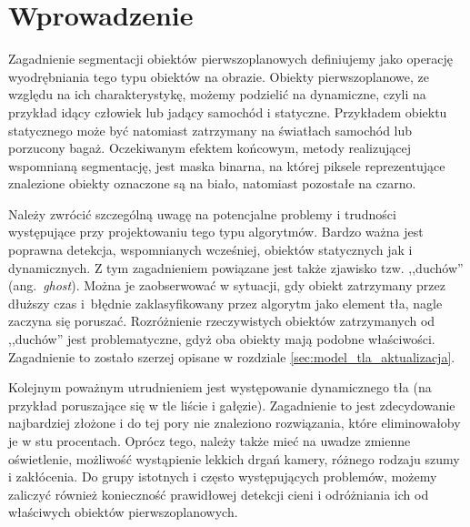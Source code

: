 \chapter{Wprowadzenie}
\label{cha:wprowadzenie}

Zagadnienie segmentacji obiektów pierwszoplanowych definiujemy jako operację wyodrębniania tego typu obiektów na obrazie. Obiekty pierwszoplanowe, ze względu na ich charakterystykę, możemy podzielić na dynamiczne, czyli na przykład idący człowiek lub jadący samochód i statyczne. 
Przykładem obiektu statycznego może być natomiast zatrzymany na światłach samochód lub porzucony bagaż.
Oczekiwanym efektem końcowym, metody realizującej wspomnianą segmentację, jest maska binarna, na której piksele reprezentujące znalezione obiekty oznaczone są na biało, natomiast pozostałe na czarno. 
 

Należy zwrócić szczególną uwagę na potencjalne problemy i trudności występujące przy projektowaniu tego typu algorytmów. 
Bardzo ważna jest poprawna detekcja, wspomnianych wcześniej, obiektów statycznych jak i dynamicznych. 
Z tym zagadnieniem powiązane jest także zjawisko tzw. ,,duchów'' (ang.~\textit{ghost}). 
Można je zaobserwować w sytuacji, gdy obiekt zatrzymany przez dłuższy czas i~błędnie zaklasyfikowany przez algorytm jako element tła, nagle zaczyna się poruszać. 
Rozróżnienie rzeczywistych obiektów zatrzymanych od ,,duchów'' jest problematyczne, gdyż oba obiekty mają podobne właściwości. 
Zagadnienie to zostało szerzej opisane w rozdziale \ref{sec:model_tla_aktualizacja}.

Kolejnym poważnym utrudnieniem jest występowanie dynamicznego tła (na przykład poruszające się w tle liście i gałęzie). 
Zagadnienie to jest zdecydowanie najbardziej złożone i do tej pory nie znaleziono rozwiązania, które eliminowałoby je w stu procentach.
Oprócz tego, należy także mieć na uwadze zmienne oświetlenie, możliwość wystąpienie lekkich drgań kamery, różnego rodzaju szumy i zakłócenia. 
Do grupy istotnych i często występujących problemów, możemy zaliczyć również konieczność prawidłowej detekcji cieni i odróżniania ich od właściwych obiektów pierwszoplanowych.

